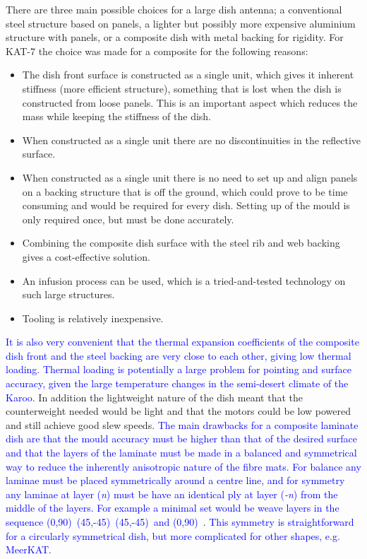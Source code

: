  There are three main possible choices for a large dish antenna; a
 conventional steel structure based on panels, a lighter but possibly
 more expensive aluminium structure with panels, or a composite dish
 with metal backing for rigidity. For KAT-7 the choice was made for a
 composite for the following reasons:

\begin{itemize}
\item The dish front surface is constructed as a single unit, which
  gives it inherent stiffness (more efficient structure), something
  that is lost when the dish is constructed from loose panels.  This
  is an important aspect which reduces the mass while keeping the
  stiffness of the dish.
\item When constructed as a single unit there are no discontinuities
  in the reflective surface.
\item When constructed as a single unit there is no need to set up and
  align panels on a backing structure that is off the ground, which
  could prove to be time consuming and would be required for every
  dish.  Setting up of the mould is only required once, but must be
  done accurately.
\item Combining the composite dish surface with the steel rib and web
  backing gives a cost-effective solution.
\item An infusion process can be used, which is a tried-and-tested
  technology on such large structures.
\item Tooling is relatively inexpensive.

\end{itemize}

\textcolor{blue}{ It is also very convenient that the thermal
  expansion coefficients of the composite dish front and the steel
  backing are very close to each other, giving low thermal
  loading. Thermal loading is potentially a large problem for pointing
  and surface accuracy, given the large temperature changes in the
  semi-desert climate of the Karoo.} 
In addition the lightweight
nature of the dish meant that the counterweight needed would be light
and that the motors could be low powered and still achieve good slew
speeds.  \textcolor{blue}{ The main drawbacks for a composite laminate
  dish are that the mould accuracy must be higher than that of the
  desired surface and that the layers of the laminate must be made in
  a balanced and symmetrical way to reduce the inherently anisotropic
  nature of the fibre mats. For balance any laminae must be placed
  symmetrically around a centre line, and for symmetry any laminae at
  layer (\textit{n}) must be have an identical ply at layer
  (\textit{-n}) from the middle of the layers. For example a minimal
  set would be weave layers in the sequence (0,90)\degr\, (45,-45)\degr\, (45,-45)\degr\
  and (0,90)\degr\ . This symmetry is straightforward for a
  circularly symmetrical dish, but more complicated for other shapes, e.g. MeerKAT.}
